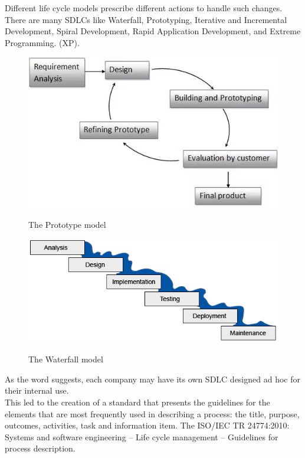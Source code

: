Different life cycle models prescribe different actions to handle such changes\cite{software_lyfe_cycle}.\\
There are many SDLCs like Waterfall, Prototyping, Iterative and Incremental Development, Spiral Development, Rapid Application Development, and Extreme Programming. (XP). 
\begin{figure}[H]
	\centering
	\includegraphics[width=.7\textwidth]{resources/prototype}\\
	\caption{The Prototype model}
\end{figure}
\begin{figure}[H]
	\centering
	\includegraphics[width=.7\textwidth]{resources/warterfall}\\
	\caption{The Waterfall model}
\end{figure}
As the word  suggests, each company may have its own SDLC designed ad hoc for their internal use.\\
This led to the creation of a standard that presents the guidelines for the elements that are most frequently used in describing a process: the title, purpose, outcomes, activities, task and information item.
The ISO/IEC TR 24774:2010: Systems and software engineering -- Life cycle management -- Guidelines for process description\cite{iso_53815}.\\
